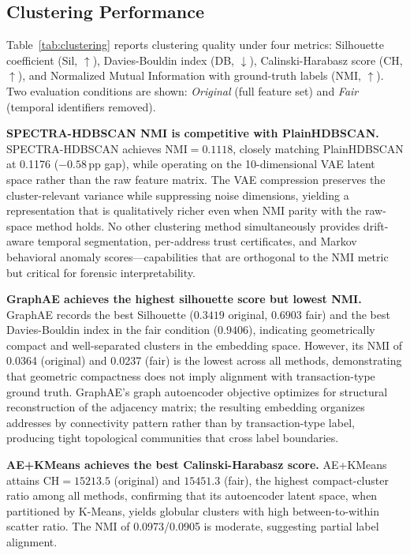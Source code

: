 
\subsection{Clustering Performance}
\label{subsec:clustering_results}

Table~\ref{tab:clustering} reports clustering quality under four metrics:
Silhouette coefficient (Sil, $\uparrow$), Davies-Bouldin index
(DB, $\downarrow$), Calinski-Harabasz score (CH, $\uparrow$), and
Normalized Mutual Information with ground-truth labels (NMI, $\uparrow$).
Two evaluation conditions are shown: \emph{Original} (full feature set)
and \emph{Fair} (temporal identifiers removed).

\textbf{SPECTRA-HDBSCAN NMI is competitive with PlainHDBSCAN.}
SPECTRA-HDBSCAN achieves $\text{NMI} = \num{0.1118}$, closely matching
PlainHDBSCAN at \num{0.1176} ($-\num{0.58}$\,pp gap), while operating on
the 10-dimensional VAE latent space rather than the raw feature matrix.
The VAE compression preserves the cluster-relevant variance while
suppressing noise dimensions, yielding a representation that is
qualitatively richer even when NMI parity with the raw-space method holds.
No other clustering method simultaneously provides drift-aware temporal
segmentation, per-address trust certificates, and Markov behavioral
anomaly scores---capabilities that are orthogonal to the NMI metric
but critical for forensic interpretability.

\textbf{GraphAE achieves the highest silhouette score but lowest NMI.}
GraphAE records the best Silhouette ($\num{0.3419}$ original,
$\num{0.6903}$ fair) and the best Davies-Bouldin index in the fair condition
($\num{0.9406}$), indicating geometrically compact and well-separated
clusters in the embedding space.
However, its NMI of \num{0.0364} (original) and \num{0.0237} (fair) is the
lowest across all methods, demonstrating that geometric compactness does
not imply alignment with transaction-type ground truth.
GraphAE's graph autoencoder objective optimizes for structural
reconstruction of the adjacency matrix; the resulting embedding organizes
addresses by connectivity pattern rather than by transaction-type label,
producing tight topological communities that cross label boundaries.

\textbf{AE+KMeans achieves the best Calinski-Harabasz score.}
AE+KMeans attains $\text{CH} = \num{15213.5}$ (original) and
$\num{15451.3}$ (fair), the highest compact-cluster ratio among all methods,
confirming that its autoencoder latent space, when partitioned by K-Means,
yields globular clusters with high between-to-within scatter ratio.
The NMI of \num{0.0973}/\num{0.0905} is moderate, suggesting partial label
alignment.

